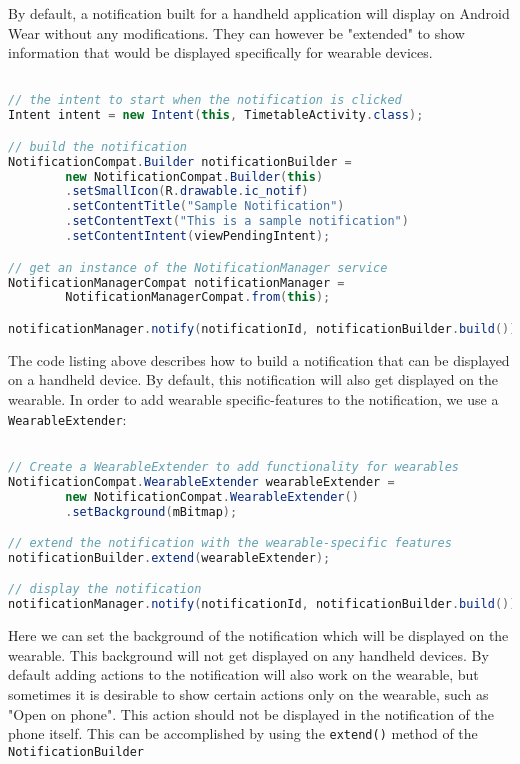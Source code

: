 By default, a notification built for a handheld application will display on
Android Wear without any modifications. They can however be "extended" to show
information that would be displayed specifically for wearable devices.

\begin{lstlisting}[language=Java]

// the intent to start when the notification is clicked
Intent intent = new Intent(this, TimetableActivity.class);

// build the notification
NotificationCompat.Builder notificationBuilder =
        new NotificationCompat.Builder(this)
        .setSmallIcon(R.drawable.ic_notif)
        .setContentTitle("Sample Notification")
        .setContentText("This is a sample notification")
        .setContentIntent(viewPendingIntent);

// get an instance of the NotificationManager service
NotificationManagerCompat notificationManager =
        NotificationManagerCompat.from(this);

notificationManager.notify(notificationId, notificationBuilder.build());

\end{lstlisting}

The code listing above describes how to build a notification that can be
displayed on a handheld device. By default, this notification will also get
displayed on the wearable. In order to add wearable specific-features to the
notification, we use a \texttt{WearableExtender}:

\begin{lstlisting}[language=Java]

// Create a WearableExtender to add functionality for wearables
NotificationCompat.WearableExtender wearableExtender =
        new NotificationCompat.WearableExtender()
        .setBackground(mBitmap);

// extend the notification with the wearable-specific features
notificationBuilder.extend(wearableExtender);

// display the notification
notificationManager.notify(notificationId, notificationBuilder.build());

\end{lstlisting}

Here we can set the background of the notification which will be displayed on
the wearable. This background will not get displayed on any handheld devices.
By default adding actions to the notification will also work on the wearable,
but sometimes it is desirable to show certain actions only on the wearable, such
as "Open on phone". This action should not be displayed in the notification of
the phone itself. This can be accomplished by using the \texttt{extend()} method
of the \texttt{NotificationBuilder}

